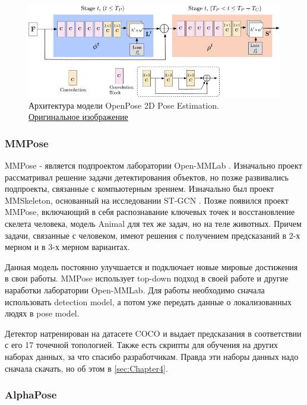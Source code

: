 \begin{figure}[h]
	\centering
	\includegraphics[width=\textwidth * 4 / 5]{./images/OpenPose/architecture.jpg}
	\caption{Архитектура модели OpenPose 2D Pose Estimation.\\ \href{https://ieeexplore.ieee.org/mediastore_new/IEEE/content/media/34/9280439/8765346/cao3-2929257-large.gif}{Оригинальное изображение}}
	\label{fig:op_architecture}
\end{figure}




\subsubsection{MMPose}

MMPose - является подпроектом лаборатории Open-MMLab \cite{mmpose2020}. Изначально проект рассматривал решение задачи детектирования объектов, но позже развивались подпроекты, связанные с компьютерным зрением. Изначально был проект MMSkeleton, основанный на исследовании ST-GCN \cite{STGCN}. Позже появился проект MMPose, включающий в себя распознавание ключевых точек и восстановление скелета человека, модель Animal для тех же задач, но на теле животных. Причем задачи, связанные с человеком, имеют решения с получением предсказаний в 2-х мерном и в 3-х мерном вариантах.

Данная модель постоянно улучшается и подключает новые мировые достижения в свои работы. MMPose использует top-down подход в своей работе и другие наработки лаборатории Open-MMLab. Для работы необходимо сначала использовать detection model, а потом уже передать данные о локализованных людях в pose model.

Детектор натренирован на датасете COCO и выдает предсказания в соответствии с его 17 точечной топологией. Также есть скрипты для обучения на других наборах данных, за что спасибо разработчикам. Правда эти наборы данных надо сначала скачать, но об этом в \autoref{sec:Chapter4}.




\subsubsection{AlphaPose}

